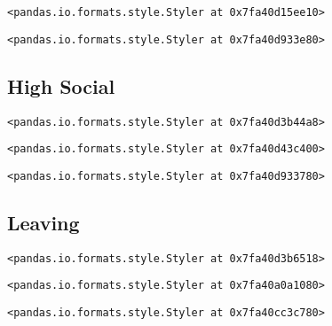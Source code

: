\documentclass[11pt]{article}
\begin{document}
    
    
    \begin{verbatim}
<pandas.io.formats.style.Styler at 0x7fa40d15ee10>
    \end{verbatim}

    
    
    \begin{verbatim}
<pandas.io.formats.style.Styler at 0x7fa40d933e80>
    \end{verbatim}

    
    \hypertarget{high-social}{%
\subsection{\texorpdfstring{\textbf{High
Social}}{High Social}}\label{high-social}}

    
    
    \begin{verbatim}
<pandas.io.formats.style.Styler at 0x7fa40d3b44a8>
    \end{verbatim}

    
    
    \begin{verbatim}
<pandas.io.formats.style.Styler at 0x7fa40d43c400>
    \end{verbatim}

    
    
    \begin{verbatim}
<pandas.io.formats.style.Styler at 0x7fa40d933780>
    \end{verbatim}

    
    \hypertarget{leaving}{%
\subsection{\texorpdfstring{\textbf{Leaving}}{Leaving}}\label{leaving}}

    
    
    \begin{verbatim}
<pandas.io.formats.style.Styler at 0x7fa40d3b6518>
    \end{verbatim}

    
    
    \begin{verbatim}
<pandas.io.formats.style.Styler at 0x7fa40a0a1080>
    \end{verbatim}

    
    
    \begin{verbatim}
<pandas.io.formats.style.Styler at 0x7fa40cc3c780>
    \end{verbatim}

    

    
    
    
    
\end{document}
